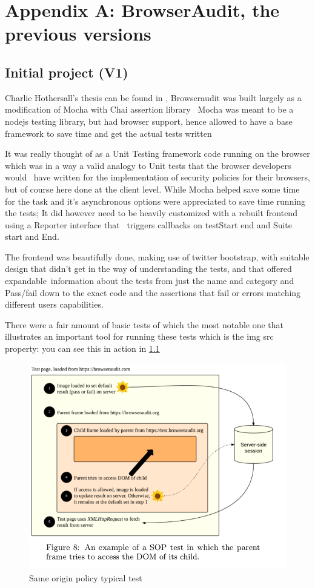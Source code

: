 \chapter{Appendix A:  BrowserAudit, the previous versions}

\section{Initial project (V1)}

Charlie Hothersall's thesis can be found in \cite{charlie} , Browseraudit was built largely as a modification of Mocha with Chai assertion library \
Mocha was meant to be a nodejs testing library, but had browser support, hence allowed to have a base framework to save time and get the actual tests written \

It was really thought of as a Unit Testing framework code running on the browser which was in a way a valid analogy to Unit tests that the browser developers would \
have written for the implementation of security policies for their browsers, but of course here done at the client level. While Mocha helped save some time for the task and
it's asynchronous options were appreciated to save time running the tests; It did however need to be heavily customized with a rebuilt frontend using a Reporter interface that \
triggers callbacks on testStart end and Suite start and End.\ 

The frontend was beautifully done, making use of twitter bootstrap, with suitable design that didn't get in the way of understanding the tests, and that offered expandable\
information about the tests from just the name and category and Pass/fail down to the exact code and the assertions that fail or errors matching different users capabilities.\

There were a fair amount of basic tests of which the most notable one that illustrates an important tool for running these tests which is the img src property:
you can see this in action in \ref{fig:sop} 

\begin{figure}
\centering
\includegraphics[width=1\textwidth]{./SOPbasic.png}
\caption{\label{fig:sop}Same origin policy typical test}
\end{figure}

